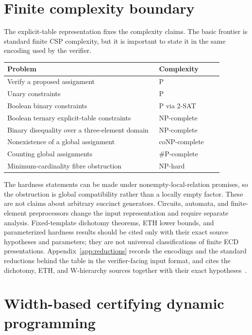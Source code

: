 \documentclass[11pt]{article}
\theoremstyle{plain}
\theoremstyle{definition}
\theoremstyle{remark}
\begin{document}
\section{Finite complexity boundary}
\label{sec:complexity}

The explicit-table representation fixes the complexity claims.  The basic
frontier is standard finite CSP complexity, but it is important to state it in
the same encoding used by the verifier.

\begin{center}
\begin{tabular}{@{}p{0.62\linewidth}p{0.26\linewidth}@{}}
\toprule
Problem & Complexity\\
\midrule
Verify a proposed assignment & P\\
Unary constraints & P\\
Boolean binary constraints & P via 2-SAT\\
Boolean ternary explicit-table constraints & NP-complete\\
Binary disequality over a three-element domain & NP-complete\\
Nonexistence of a global assignment & coNP-complete\\
Counting global assignments & \(\#\mathrm P\)-complete\\
Minimum-cardinality fibre obstruction & NP-hard\\
\bottomrule
\end{tabular}
\end{center}

The hardness statements can be made under nonempty-local-relation promises, so
the obstruction is global compatibility rather than a locally empty factor.
These are not claims about arbitrary succinct generators.  Circuits, automata,
and finite-element preprocessors change the input representation and require
separate analysis.  Fixed-template dichotomy theorems, ETH lower bounds, and
parameterized hardness results should be cited only with their exact source
hypotheses and parameters; they are not universal classifications of finite ECD
presentations.  Appendix~\ref{app:reductions} records the encodings and the
standard reductions behind the table in the verifier-facing input format, and
cites the dichotomy, ETH, and W-hierarchy sources together with their exact
hypotheses~\cite{schaefer78,zhuk17,impagliazzo-paturi01,downey-fellows99}.

\section{Width-based certifying dynamic programming}
\label{sec:width-dp}
\end{document}
